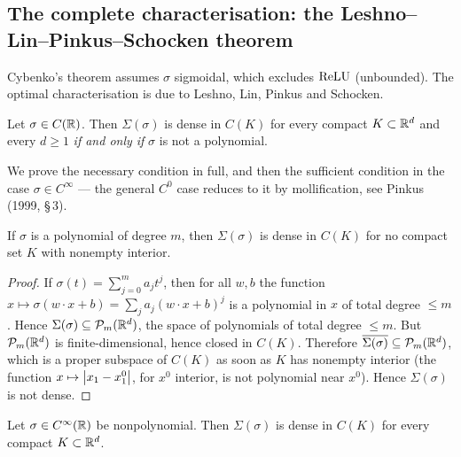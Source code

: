 \documentclass[11pt,a4paper]{article}
\begin{document}
\subsection{The complete characterisation: the Leshno--Lin--Pinkus--Schocken theorem}

Cybenko's theorem assumes $\sigma$ sigmoidal, which excludes $\operatorname{ReLU}$ (unbounded). The optimal
characterisation is due to Leshno, Lin, Pinkus and Schocken.

\begin{theorem}[LLPS, 1993]\label{th:llps}
Let $\sigma \in C(\mathbb{R})$. Then $\Sigma(\sigma)$ is dense in $C(K)$ for every compact
$K \subset \mathbb{R}^d$ and every $d \ge 1$ \emph{if and only if} $\sigma$ is not a polynomial.
\end{theorem}

We prove the necessary condition in full, and then the sufficient condition in the case
$\sigma \in C^\infty$ --- the general $C^0$ case reduces to it by mollification, see Pinkus (1999,
§\,3).

\begin{proposition}[Necessity]\label{prop:poly}
If $\sigma$ is a polynomial of degree $m$, then $\Sigma(\sigma)$ is dense in $C(K)$ for no compact
set $K$ with nonempty interior.
\end{proposition}

\begin{proof}
If $\sigma(t) = \sum_{j=0}^m a_j t^j$, then for all $w,b$ the function
$x \mapsto \sigma(w\cdot x + b) = \sum_j a_j (w\cdot x + b)^j$ is a polynomial in $x$ of total
degree $\le m$. Hence $\Sigma(\sigma) \subseteq \mathcal{P}_m(\mathbb{R}^d)$, the space of polynomials of total
degree $\le m$. But $\mathcal{P}_m(\mathbb{R}^d)$ is finite-dimensional, hence closed in $C(K)$. Therefore
$\overline{\Sigma(\sigma)} \subseteq \mathcal{P}_m(\mathbb{R}^d)$, which is a proper subspace of $C(K)$ as soon as
$K$ has nonempty interior (the function $x \mapsto \left\lvert x_1 - x_1^0 \right\rvert$, for $x^0$ interior, is not
polynomial near $x^0$). Hence $\Sigma(\sigma)$ is not dense.
\end{proof}

\begin{proposition}\label{prop:llps-smooth}
Let $\sigma \in C^\infty(\mathbb{R})$ be nonpolynomial. Then $\Sigma(\sigma)$ is dense in $C(K)$ for every
compact $K \subset \mathbb{R}^d$.
\end{proposition}
\end{document}
